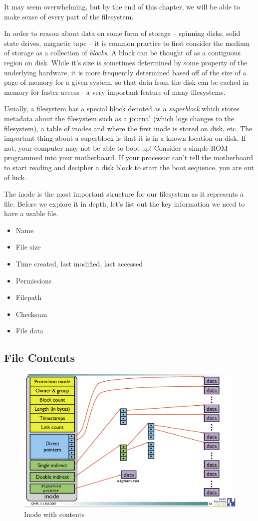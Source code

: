 It may seem overwhelming, but by the end of this chapter, we will be able to make sense of every part of the filesystem.

In order to reason about data on some form of storage -- spinning disks, solid state drives, magnetic tape -- it is common practice to first consider the medium of storage as a collection of \emph{blocks}.
A block can be thought of as a contiguous region on disk.
While it's size is sometimes determined by some property of the underlying hardware, it is more frequently determined based off of the size of a page of memory for a given system, so that data from the disk can be cached in memory for faster access - a very important feature of many filesystems.

Usually, a filesystem has a special block denoted as a \emph{superblock} which stores metadata about the filesystem such as a journal (which logs changes to the filesystem), a table of inodes and where the first inode is stored on disk, etc.
The important thing about a superblock is that it is in a known location on disk.
If not, your computer may not be able to boot up!
Consider a simple ROM programmed into your motherboard.
If your processor can't tell the motherboard to start reading and decipher a disk block to start the boot sequence, you are out of luck.

The inode is the most important structure for our filesystem as it represents a file.
Before we explore it in depth, let's list out the key information we need to have a usable file.

\begin{itemize}
\tightlist
  \item Name
  \item File size
  \item Time created, last modified, last accessed
  \item Permissions
  \item Filepath
  \item Checksum
  \item File data
\end{itemize}

\subsection{File Contents}

\begin{figure}[htbp]
\centering
\includegraphics[width=.8\textwidth]{filesystems/images/inode_with_signatures.jpg}
\caption{Inode with contents}
\end{figure}

